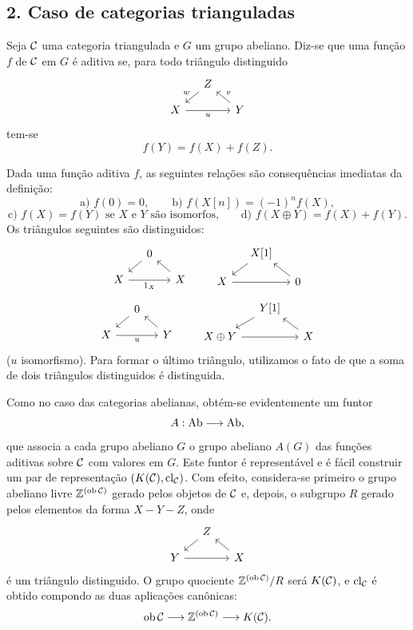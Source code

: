 \subsection*{2. Caso de categorias trianguladas}

Seja $\mathcal C$ uma categoria triangulada e $G$ um grupo abeliano. Diz-se que uma função $f$ de $\mathcal C$ em $G$ é aditiva se, para todo triângulo distinguido
\[
\begin{tikzcd}[column sep=small,row sep=small]
& Z \arrow[dl,"w"']\\
X \arrow[rr,"u"'] && Y \arrow[ul,"v"']
\end{tikzcd}
\]
tem-se
\[
f(Y)=f(X)+f(Z).
\]

Dada uma função aditiva $f$, as seguintes relações são consequências imediatas da definição:
\[
\text{a) } f(0)=0,\qquad
\text{b) } f(X[n])=(-1)^n f(X),
\]
\[
\text{c) } f(X)=f(Y)\text{ se }X\text{ e }Y\text{ são isomorfos,}
\qquad
\text{d) } f(X\oplus Y)=f(X)+f(Y).
\]
Os triângulos seguintes são distinguidos:
\[
\begin{tikzcd}[column sep=small,row sep=small]
&0 \arrow[dl]\\ X \arrow[rr,"1_X"']&&X\arrow[ul]
\end{tikzcd}
\qquad
\begin{tikzcd}[column sep=small,row sep=small]
&X[1]\arrow[dl]\\ X\arrow[rr]&&0\arrow[ul]
\end{tikzcd}
\]
\[
\begin{tikzcd}[column sep=small,row sep=small]
&0\arrow[dl]\\ X\arrow[rr,"u"']&&Y\arrow[ul]
\end{tikzcd}
\qquad
\begin{tikzcd}[column sep=small,row sep=small]
&Y[1]\arrow[dl]\\ X\oplus Y\arrow[rr]&&X\arrow[ul]
\end{tikzcd}
\]
($u$ isomorfismo). Para formar o último triângulo, utilizamos o fato de que a soma de dois triângulos distinguidos é distinguida.

Como no caso das categorias abelianas, obtém-se evidentemente um funtor
\[
A:\operatorname{Ab}\longrightarrow\operatorname{Ab},
\]
que associa a cada grupo abeliano $G$ o grupo abeliano $A(G)$ das funções aditivas sobre $\mathcal C$ com valores em $G$. Este funtor é representável e é fácil construir um par de representação $(K(\mathcal C),\operatorname{cl}_{\mathcal C})$. Com efeito, considera-se primeiro o grupo abeliano livre $\mathbb Z^{(\operatorname{ob}\mathcal C)}$ gerado pelos objetos de $\mathcal C$ e, depois, o subgrupo $R$ gerado pelos elementos da forma $X-Y-Z$, onde
\[
\begin{tikzcd}[column sep=small,row sep=small]
&Z\arrow[dl]\\ Y\arrow[rr]&&X\arrow[ul]
\end{tikzcd}
\]
é um triângulo distinguido. O grupo quociente $\mathbb Z^{(\operatorname{ob}\mathcal C)}/R$ será $K(\mathcal C)$, e $\operatorname{cl}_{\mathcal C}$ é obtido compondo as duas aplicações canônicas:
\[
\operatorname{ob}\mathcal C\longrightarrow \mathbb Z^{(\operatorname{ob}\mathcal C)}\longrightarrow K(\mathcal C).
\]
